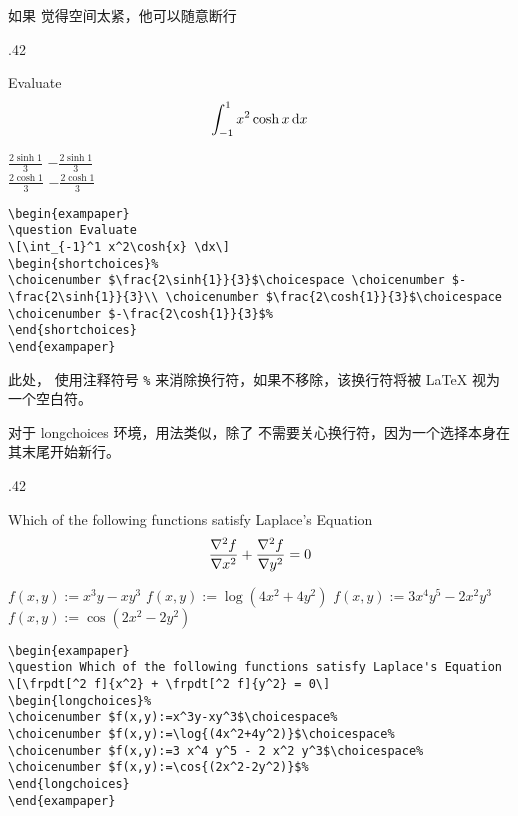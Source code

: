 如果 \raul{} 觉得空间太紧，他可以随意断行
\begin{miniexammar}{.42\textandmarginlen}{
\begin{exampaper}
\question Evaluate
\[
\int_{-1}^1 x^2\cosh{x} \dx
\]
\begin{shortchoices}%
\choicenumber $\frac{2\sinh{1}}{3}$\choicespace%
\choicenumber $-\frac{2\sinh{1}}{3}$\\
\choicenumber $\frac{2\cosh{1}}{3}$\choicespace%
\choicenumber $-\frac{2\cosh{1}}{3}$%
\end{shortchoices}
\end{exampaper}
}
\begin{lstlisting}
\begin{exampaper}
\question Evaluate
\[\int_{-1}^1 x^2\cosh{x} \dx\]
\begin{shortchoices}%
\choicenumber $\frac{2\sinh{1}}{3}$\choicespace \choicenumber $-\frac{2\sinh{1}}{3}\\ \choicenumber $\frac{2\cosh{1}}{3}$\choicespace \choicenumber $-\frac{2\cosh{1}}{3}$%
\end{shortchoices}
\end{exampaper}
\end{lstlisting}
\end{miniexammar}
此处，\raul{} 使用注释符号 \verb=%= 来消除换行符，如果不移除，该换行符将被 \LaTeX{} 视为一个空白符。

对于 longchoices 环境，用法类似，除了 \raul{} 不需要关心换行符，因为一个选择本身在其末尾开始新行。
\begin{miniexammar}{.42\textandmarginlen}{
\begin{exampaper}
\question Which of the following functions satisfy Laplace's Equation
\[\frpdt[^2 f]{x^2} + \frpdt[^2 f]{y^2} = 0\]
\begin{longchoices}%
\choicenumber $f(x,y):=x^3y-xy^3$\choicespace%
\choicenumber $f(x,y):=\log{(4x^2+4y^2)}$\choicespace%
\choicenumber $f(x,y):=3 x^4 y^5 - 2 x^2 y^3$\choicespace%
\choicenumber $f(x,y):=\cos{(2x^2-2y^2)}$%
\end{longchoices}
\end{exampaper}
}
\begin{lstlisting}
\begin{exampaper}
\question Which of the following functions satisfy Laplace's Equation
\[\frpdt[^2 f]{x^2} + \frpdt[^2 f]{y^2} = 0\]
\begin{longchoices}%
\choicenumber $f(x,y):=x^3y-xy^3$\choicespace%
\choicenumber $f(x,y):=\log{(4x^2+4y^2)}$\choicespace%
\choicenumber $f(x,y):=3 x^4 y^5 - 2 x^2 y^3$\choicespace%
\choicenumber $f(x,y):=\cos{(2x^2-2y^2)}$%
\end{longchoices}
\end{exampaper}
\end{lstlisting}
\end{miniexammar}

